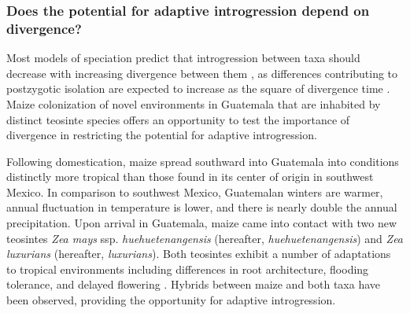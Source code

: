 \subsubsection{Does the potential for adaptive introgression depend on divergence?}
\label{sss:adaptive_intro}
Most models of speciation predict that introgression between taxa should decrease with increasing divergence between them \citep{harrison2014hybridization}, as differences contributing to postzygotic isolation are expected to increase as the square of divergence time \citep{orr2001evolution}. Maize colonization of novel environments in Guatemala that are inhabited by distinct teosinte species offers an opportunity to test the importance of divergence in restricting the potential for adaptive introgression.

Following domestication, maize spread southward into Guatemala into conditions distinctly more tropical than those found in its center of origin in southwest Mexico.
In comparison to southwest Mexico, Guatemalan winters are warmer, annual fluctuation in temperature is lower, and there is nearly double the annual precipitation.
Upon arrival in Guatemala, maize came into contact with two new teosintes \emph{Zea mays} ssp. \emph{huehuetenangensis} (hereafter, \emph{huehuetenangensis}) and \emph{Zea luxurians} (hereafter, \emph{luxurians}). 
Both teosintes exhibit a number of adaptations to tropical environments including differences in root architecture, flooding tolerance, and delayed flowering \citep{wilkes1967teosinte, mano2006}.
Hybrids between maize and both taxa \citep{wilkes1967teosinte} have been observed, providing the opportunity for adaptive introgression.  

